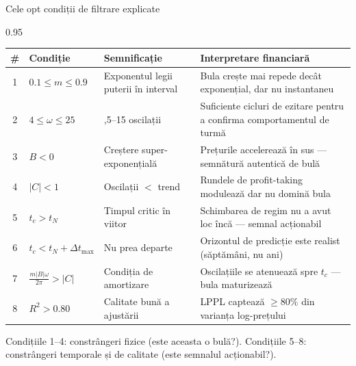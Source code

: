 \documentclass[9pt, aspectratio=169, t]{beamer}
\begin{document}
\begin{frame}{Cele opt condiții de filtrare explicate}
    \begin{cminipage}{0.95\textwidth}
    {\scriptsize
    \renewcommand{\arraystretch}{1.35}
    \begin{tabular}{c >{\raggedright\arraybackslash}p{2.8cm} >{\raggedright\arraybackslash}p{3.2cm} >{\raggedright\arraybackslash}p{4.0cm}}
        \toprule
        \textbf{\#} & \textbf{Condiție} & \textbf{Semnificație} & \textbf{Interpretare financiară} \\
        \midrule
        \rowcolor{MainBlue!8}
        1 & $0.1 \leq m \leq 0.9$ & Exponentul legii puterii în interval & Bula crește mai repede decât exponențial, dar nu instantaneu \\
        2 & $4 \leq \omega \leq 25$ & 2,5--15 oscilații & Suficiente cicluri de ezitare pentru a confirma comportamentul de turmă \\
        \rowcolor{MainBlue!8}
        3 & $B < 0$ & Creștere super-exponențială & Prețurile accelerează în sus --- semnătură autentică de bulă \\
        4 & $|C| < 1$ & Oscilații $<$ trend & Rundele de profit-taking modulează dar nu domină bula \\
        \midrule
        \rowcolor{Crimson!8}
        5 & $t_c > t_N$ & Timpul critic în viitor & Schimbarea de regim nu a avut loc încă --- semnal acționabil \\
        \rowcolor{Crimson!8}
        6 & $t_c < t_N + \Delta t_{\max}$ & Nu prea departe & Orizontul de predicție este realist (săptămâni, nu ani) \\
        7 & $\frac{m|B|\omega}{2\pi} > |C|$ & Condiția de amortizare & Oscilațiile se atenuează spre $t_c$ --- bula maturizează \\
        \rowcolor{Crimson!8}
        8 & $R^2 > 0.80$ & Calitate bună a ajustării & LPPL captează $\geq 80\%$ din varianța log-prețului \\
        \bottomrule
    \end{tabular}
    }
    \vspace{2mm}
    {\scriptsize\textcolor{MediumGray}{Condițiile 1--4: constrângeri fizice (este aceasta o bulă?). Condițiile 5--8: constrângeri temporale și de calitate (este semnalul acționabil?).}}
    \end{cminipage}
\end{frame}
\end{document}

